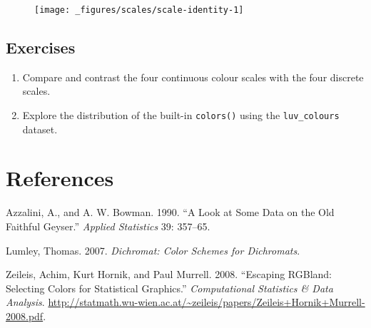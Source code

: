 \begin{Shaded}
\begin{Highlighting}[]

\StringTok{ }
\StringTok{  }\NormalTok{(}\NormalTok{(}  \NormalTok{) +}\StringTok{ }
\StringTok{  }\NormalTok{() +}\StringTok{ }
\StringTok{  }\NormalTok{()}
\end{Highlighting}
\end{Shaded}

\begin{figure}[H]
  \centering
  \texttt{[image: \_figures/scales/scale-identity-1]}
\end{figure}

\subsection{Exercises}\label{exercises-4}

\begin{enumerate}
\def\labelenumi{\arabic{enumi}.}
\item
  Compare and contrast the four continuous colour scales with the four
  discrete scales.
\item
  Explore the distribution of the built-in \texttt{colors()} using the
  \texttt{luv\_colours} dataset.
\end{enumerate}

\section*{References}\label{references}

\hypertarget{refs}{}
\hypertarget{ref-azzalini:1990}{}
Azzalini, A., and A. W. Bowman. 1990. ``A Look at Some Data on the Old
Faithful Geyser.'' \emph{Applied Statistics} 39: 357--65.

\hypertarget{ref-dichromat}{}
Lumley, Thomas. 2007. \emph{Dichromat: Color Schemes for Dichromats}.

\hypertarget{ref-zeileis:2008}{}
Zeileis, Achim, Kurt Hornik, and Paul Murrell. 2008. ``Escaping RGBland:
Selecting Colors for Statistical Graphics.'' \emph{Computational
Statistics \& Data Analysis}.
\url{http://statmath.wu-wien.ac.at/~zeileis/papers/Zeileis+Hornik+Murrell-2008.pdf}.
